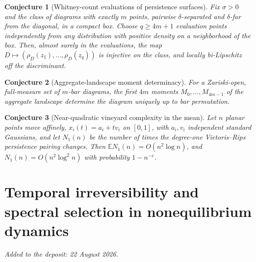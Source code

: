 \documentclass[11pt]{article}
\newtheorem{conjecture}{Conjecture}
\theoremstyle{definition}
\newcommand{\E}{\mathbb E}
\providecommand{\E}{\mathbb E}
\begin{document}
\begin{conjecture}[Whitney-count evaluations of persistence surfaces]\label{ai10}
Fix $\sigma>0$ and the class of diagrams with exactly $m$ points, pairwise $\delta$-separated and $\delta$-far from the diagonal, in a compact box.  Choose $q\ge4m+1$ evaluation points independently from any distribution with positive density on a neighborhood of the box.  Then, almost surely in the evaluations, the map $D\mapsto(\rho_D(z_1),\ldots,\rho_D(z_q))$ is injective on the class, and locally bi-Lipschitz off the discriminant.
\end{conjecture}

\begin{conjecture}[Aggregate-landscape moment determinacy]\label{ai11}
For a Zariski-open, full-measure set of $m$-bar diagrams, the first $4m$ moments $M_0,\ldots,M_{4m-1}$ of the aggregate landscape determine the diagram uniquely up to bar permutation.
\end{conjecture}

\begin{conjecture}[Near-quadratic vineyard complexity in the mean]\label{ai12}
Let $n$ planar points move affinely, $x_i(t)=a_i+tv_i$ on $[0,1]$, with $a_i,v_i$ independent standard Gaussians, and let $N_1(n)$ be the number of times the degree-one Vietoris--Rips persistence pairing changes.  Then $\E N_1(n)=O(n^2\log n)$, and $N_1(n)=O(n^2\log^2n)$ with probability $1-n^{-c}$.
\end{conjecture}


\part{Temporal irreversibility and spectral selection in nonequilibrium dynamics}

\medskip\noindent\emph{Added to the deposit: 22 August 2026.}\par\medskip
\end{document}
